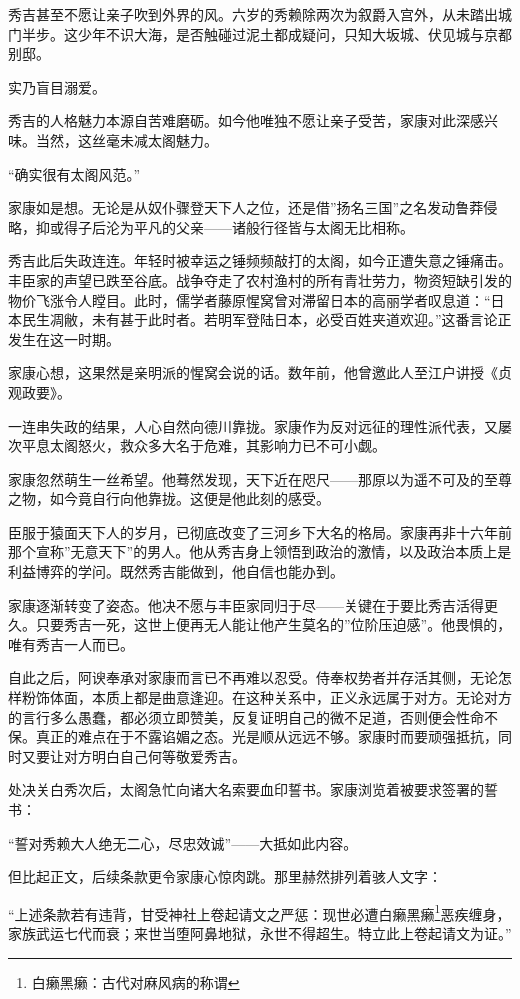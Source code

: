 \documentclass[
]{article}
\begin{document}
秀吉甚至不愿让亲子吹到外界的风。六岁的秀赖除两次为叙爵入宫外，从未踏出城门半步。这少年不识大海，是否触碰过泥土都成疑问，只知大坂城、伏见城与京都别邸。

实乃盲目溺爱。

秀吉的人格魅力本源自苦难磨砺。如今他唯独不愿让亲子受苦，家康对此深感兴味。当然，这丝毫未减太阁魅力。

``确实很有太阁风范。''

家康如是想。无论是从奴仆骤登天下人之位，还是借''扬名三国''之名发动鲁莽侵略，抑或得子后沦为平凡的父亲------诸般行径皆与太阁无比相称。

秀吉此后失政连连。年轻时被幸运之锤频频敲打的太阁，如今正遭失意之锤痛击。丰臣家的声望已跌至谷底。战争夺走了农村渔村的所有青壮劳力，物资短缺引发的物价飞涨令人瞠目。此时，儒学者藤原惺窝曾对滞留日本的高丽学者叹息道：``日本民生凋敝，未有甚于此时者。若明军登陆日本，必受百姓夹道欢迎。''这番言论正发生在这一时期。

家康心想，这果然是亲明派的惺窝会说的话。数年前，他曾邀此人至江户讲授《贞观政要》。

一连串失政的结果，人心自然向德川靠拢。家康作为反对远征的理性派代表，又屡次平息太阁怒火，救众多大名于危难，其影响力已不可小觑。

家康忽然萌生一丝希望。他蓦然发现，天下近在咫尺------那原以为遥不可及的至尊之物，如今竟自行向他靠拢。这便是他此刻的感受。

臣服于猿面天下人的岁月，已彻底改变了三河乡下大名的格局。家康再非十六年前那个宣称''无意天下''的男人。他从秀吉身上领悟到政治的激情，以及政治本质上是利益博弈的学问。既然秀吉能做到，他自信也能办到。

家康逐渐转变了姿态。他决不愿与丰臣家同归于尽------关键在于要比秀吉活得更久。只要秀吉一死，这世上便再无人能让他产生莫名的''位阶压迫感''。他畏惧的，唯有秀吉一人而已。

自此之后，阿谀奉承对家康而言已不再难以忍受。侍奉权势者并存活其侧，无论怎样粉饰体面，本质上都是曲意逢迎。在这种关系中，正义永远属于对方。无论对方的言行多么愚蠢，都必须立即赞美，反复证明自己的微不足道，否则便会性命不保。真正的难点在于不露谄媚之态。光是顺从远远不够。家康时而要顽强抵抗，同时又要让对方明白自己何等敬爱秀吉。

处决关白秀次后，太阁急忙向诸大名索要血印誓书。家康浏览着被要求签署的誓书：

``誓对秀赖大人绝无二心，尽忠效诚''------大抵如此内容。

但比起正文，后续条款更令家康心惊肉跳。那里赫然排列着骇人文字：

``上述条款若有违背，甘受神社上卷起请文之严惩：现世必遭白癞黑癞\footnote{白癞黑癞：古代对麻风病的称谓}恶疾缠身，家族武运七代而衰；来世当堕阿鼻地狱，永世不得超生。特立此上卷起请文为证。''
\end{document}
